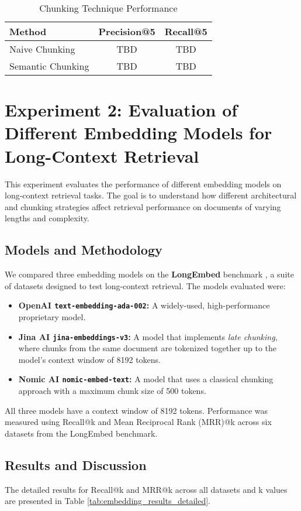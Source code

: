 \begin{table}[!htbp]
\centering
\caption{Chunking Technique Performance}
\label{tab:chunking_results}
\begin{tabular}{|l|c|c|}
\hline
\textbf{Method} & \textbf{Precision@5} & \textbf{Recall@5} \\
\hline
Naive Chunking & TBD & TBD \\
Semantic Chunking & TBD & TBD \\
\hline
\end{tabular}
\end{table}

\section{Experiment 2: Evaluation of Different Embedding Models for Long-Context Retrieval}
\label{sec:exp_embedding_models}
This experiment evaluates the performance of different embedding models on long-context retrieval tasks. The goal is to understand how different architectural and chunking strategies affect retrieval performance on documents of varying lengths and complexity.

\subsection{Models and Methodology}
We compared three embedding models on the \textbf{LongEmbed} benchmark \autocite{zhu2024longembedextendingembeddingmodels}, a suite of datasets designed to test long-context retrieval. The models evaluated were:
\begin{itemize}
    \item \textbf{OpenAI \texttt{text-embedding-ada-002}:} A widely-used, high-performance proprietary model.
    \item \textbf{Jina AI \texttt{jina-embeddings-v3}:} A model that implements \textit{late chunking}, where chunks from the same document are tokenized together up to the model's context window of 8192 tokens.
    \item \textbf{Nomic AI \texttt{nomic-embed-text}:} A model that uses a classical chunking approach with a maximum chunk size of 500 tokens.
\end{itemize}
All three models have a context window of 8192 tokens. Performance was measured using Recall@k and Mean Reciprocal Rank (MRR)@k across six datasets from the LongEmbed benchmark.

\subsection{Results and Discussion}
The detailed results for Recall@k and MRR@k across all datasets and k values are presented in Table \ref{tab:embedding_results_detailed}.

